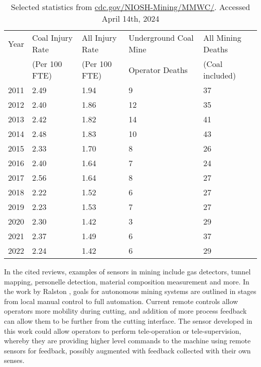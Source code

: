 \begin{table}[]
\centering
\caption{Selected statistics from \url{cdc.gov/NIOSH-Mining/MMWC/}. Accessed April 14th, 2024}
\label{tab:deaths}
\begin{tabular}{|l|l|l|l|l|}
\hline
Year & Coal Injury Rate & All Injury Rate & Underground Coal Mine & All Mining Deaths \\
     & (Per 100 FTE)    & (Per 100 FTE)   & Operator Deaths       & (Coal included)   \\ \hline
2011 & 2.49             & 1.94            & 9                     & 37                \\ \hline
2012 & 2.40             & 1.86            & 12                    & 35                \\ \hline
2013 & 2.42             & 1.82            & 14                    & 41                \\ \hline
2014 & 2.48             & 1.83            & 10                    & 43                \\ \hline
2015 & 2.33             & 1.70            & 8                     & 26                \\ \hline
2016 & 2.40             & 1.64            & 7                     & 24                \\ \hline
2017 & 2.56             & 1.64            & 8                     & 27                \\ \hline
2018 & 2.22             & 1.52            & 6                     & 27                \\ \hline
2019 & 2.23             & 1.53            & 7                     & 27                \\ \hline
2020 & 2.30             & 1.42            & 3                     & 29                \\ \hline
2021 & 2.37             & 1.49            & 6                     & 37                \\ \hline
2022 & 2.24             & 1.42            & 6                     & 29                \\ \hline
\end{tabular}
\end{table}

In the cited reviews, examples of sensors in mining include
gas detectors, tunnel mapping, personelle detection, material composition measurement and more.
In the work by Ralston \cite{RALSTON2014305}, goals for autonomous mining systems are outlined in stages
from local manual control to full automation.
Current remote controls allow operators more mobility during cutting, and addition of 
more process feedback can allow them to be further from the cutting interface.
The sensor developed in this work could allow operators to perform tele-operation or tele-supervision,
whereby they are providing higher level commands to the machine using remote sensors for feedback, 
possibly augmented with feedback collected with their own senses.

